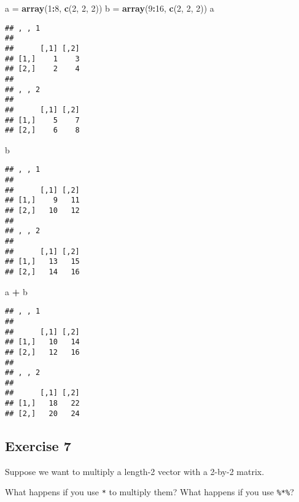 \documentclass[
]{article}
\newenvironment{Shaded}{\begin{snugshade}}{\end{snugshade}}
\newcommand{\DecValTok}[1]{\textcolor[rgb]{0.00,0.00,0.81}{#1}}
\newcommand{\KeywordTok}[1]{\textcolor[rgb]{0.13,0.29,0.53}{\textbf{#1}}}
\newcommand{\NormalTok}[1]{#1}
\newcommand{\OperatorTok}[1]{\textcolor[rgb]{0.81,0.36,0.00}{\textbf{#1}}}
\newcommand{\StringTok}[1]{\textcolor[rgb]{0.31,0.60,0.02}{#1}}
\begin{document}
\begin{Shaded}
\begin{Highlighting}[]
\NormalTok{a =}\StringTok{ }\KeywordTok{array}\NormalTok{(}\DecValTok{1}\OperatorTok{:}\DecValTok{8}\NormalTok{, }\KeywordTok{c}\NormalTok{(}\DecValTok{2}\NormalTok{, }\DecValTok{2}\NormalTok{, }\DecValTok{2}\NormalTok{))}
\NormalTok{b =}\StringTok{ }\KeywordTok{array}\NormalTok{(}\DecValTok{9}\OperatorTok{:}\DecValTok{16}\NormalTok{, }\KeywordTok{c}\NormalTok{(}\DecValTok{2}\NormalTok{, }\DecValTok{2}\NormalTok{, }\DecValTok{2}\NormalTok{))}
\NormalTok{a}
\end{Highlighting}
\end{Shaded}

\begin{verbatim}
## , , 1
## 
##      [,1] [,2]
## [1,]    1    3
## [2,]    2    4
## 
## , , 2
## 
##      [,1] [,2]
## [1,]    5    7
## [2,]    6    8
\end{verbatim}

\begin{Shaded}
\begin{Highlighting}[]
\NormalTok{b}
\end{Highlighting}
\end{Shaded}

\begin{verbatim}
## , , 1
## 
##      [,1] [,2]
## [1,]    9   11
## [2,]   10   12
## 
## , , 2
## 
##      [,1] [,2]
## [1,]   13   15
## [2,]   14   16
\end{verbatim}

\begin{Shaded}
\begin{Highlighting}[]
\NormalTok{a }\OperatorTok{+}\StringTok{ }\NormalTok{b}
\end{Highlighting}
\end{Shaded}

\begin{verbatim}
## , , 1
## 
##      [,1] [,2]
## [1,]   10   14
## [2,]   12   16
## 
## , , 2
## 
##      [,1] [,2]
## [1,]   18   22
## [2,]   20   24
\end{verbatim}

\hypertarget{exercise-7}{%
\subsection{Exercise 7}\label{exercise-7}}

Suppose we want to multiply a length-2 vector with a 2-by-2 matrix.

What happens if you use \texttt{*} to multiply them? What happens if you
use \texttt{\%*\%}?
\end{document}
